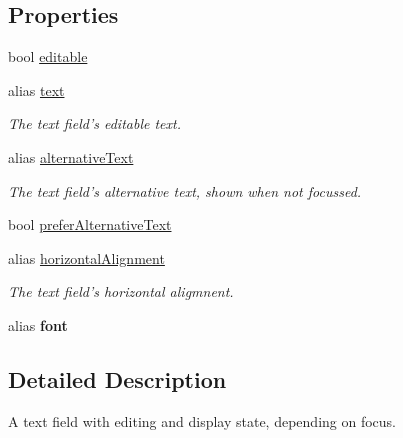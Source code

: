 \subsection*{Properties}
\begin{DoxyCompactItemize}
\item 
bool \hyperlink{classFocusAndEditTextField_af9099a4508112eccd7f6b0aea8cd3970}{editable}
\item 
\hypertarget{classFocusAndEditTextField_aeeed77be86ff52a0e1da7ce90b195511}{alias \hyperlink{classFocusAndEditTextField_aeeed77be86ff52a0e1da7ce90b195511}{text}}\label{classFocusAndEditTextField_aeeed77be86ff52a0e1da7ce90b195511}

\begin{DoxyCompactList}\small\item\em The text field's editable text. \end{DoxyCompactList}\item 
\hypertarget{classFocusAndEditTextField_a58220733c8bb84ab237df77f02b108c6}{alias \hyperlink{classFocusAndEditTextField_a58220733c8bb84ab237df77f02b108c6}{alternative\-Text}}\label{classFocusAndEditTextField_a58220733c8bb84ab237df77f02b108c6}

\begin{DoxyCompactList}\small\item\em The text field's alternative text, shown when not focussed. \end{DoxyCompactList}\item 
bool \hyperlink{classFocusAndEditTextField_ae40af8644ebd8001c47648f0934b0030}{prefer\-Alternative\-Text}
\item 
\hypertarget{classFocusAndEditTextField_a6ebf8b41df05ab797a3d62d521c102a5}{alias \hyperlink{classFocusAndEditTextField_a6ebf8b41df05ab797a3d62d521c102a5}{horizontal\-Alignment}}\label{classFocusAndEditTextField_a6ebf8b41df05ab797a3d62d521c102a5}

\begin{DoxyCompactList}\small\item\em The text field's horizontal aligmnent. \end{DoxyCompactList}\item 
\hypertarget{classFocusAndEditTextField_a7426f0bfdfdd1f6647b640f078bcc671}{alias {\bfseries font}}\label{classFocusAndEditTextField_a7426f0bfdfdd1f6647b640f078bcc671}

\end{DoxyCompactItemize}


\subsection{Detailed Description}
A text field with editing and display state, depending on focus.


